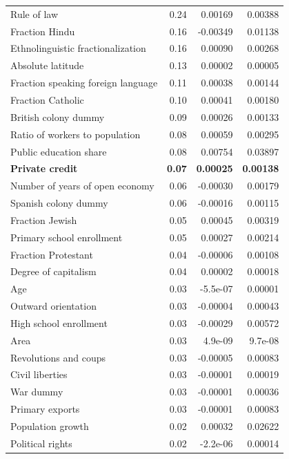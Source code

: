 \begin{refsection}
\begin{table}[!ht]
\begin{tabular}{lrrr}
		Rule of law & 0.24 & 0.00169 & 0.00388 \\ 
		Fraction Hindu & 0.16 & -0.00349 & 0.01138 \\ 
		Ethnolinguistic fractionalization & 0.16 & 0.00090 & 0.00268 \\ 
		Absolute latitude & 0.13 & 0.00002 & 0.00005 \\ 
		Fraction speaking foreign language & 0.11 & 0.00038 & 0.00144 \\ 
		Fraction Catholic & 0.10 & 0.00041 & 0.00180 \\ 
		British colony dummy & 0.09 & 0.00026 & 0.00133 \\ 
		Ratio of workers to population & 0.08 & 0.00059 & 0.00295 \\ 
		Public education share & 0.08 & 0.00754 & 0.03897 \\ 
		\textbf{Private credit} & \textbf{0.07} & \textbf{0.00025} & \textbf{0.00138} \\ 
		Number of years of open economy & 0.06 & -0.00030 & 0.00179 \\ 
		Spanish colony dummy & 0.06 & -0.00016 & 0.00115 \\ 
		Fraction Jewish & 0.05 & 0.00045 & 0.00319 \\ 
		Primary school enrollment & 0.05 & 0.00027 & 0.00214 \\ 
		Fraction Protestant & 0.04 & -0.00006 & 0.00108 \\ 
		Degree of capitalism & 0.04 & 0.00002 & 0.00018 \\ 
		Age & 0.03 & -5.5e-07 & 0.00001 \\ 
		Outward orientation & 0.03 & -0.00004 & 0.00043 \\ 
		High school enrollment & 0.03 & -0.00029 & 0.00572 \\ 
		Area & 0.03 & 4.9e-09 & 9.7e-08 \\ 
		Revolutions and coups & 0.03 & -0.00005 & 0.00083 \\ 
		Civil liberties & 0.03 & -0.00001 & 0.00019 \\ 
		War dummy & 0.03 & -0.00001 & 0.00036 \\ 
		Primary exports & 0.03 & -0.00001 & 0.00083 \\ 
		Population growth & 0.02 & 0.00032 & 0.02622 \\ 
		Political rights & 0.02 & -2.2e-06 & 0.00014 \\
		\bottomrule
	\end{tabular}
\end{table}
%


\end{refsection}
